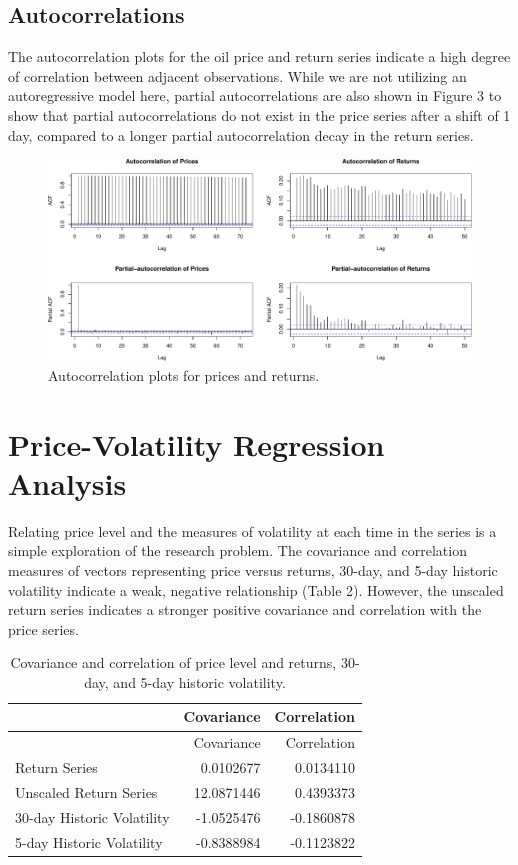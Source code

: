 \documentclass[]{article}
\begin{document}
\subsection{Autocorrelations}\label{autocorrelations}

The autocorrelation plots for the oil price and return series indicate a
high degree of correlation between adjacent observations. While we are
not utilizing an autoregressive model here, partial autocorrelations are
also shown in Figure 3 to show that partial autocorrelations do not
exist in the price series after a shift of 1 day, compared to a longer
partial autocorrelation decay in the return series.

\begin{figure}[htbp]
\centering
\includegraphics{Figs/unnamed-chunk-6-1.pdf}
\caption{Autocorrelation plots for prices and returns.}
\end{figure}

\section{Price-Volatility Regression
Analysis}\label{price-volatility-regression-analysis}

Relating price level and the measures of volatility at each time in the
series is a simple exploration of the research problem. The covariance
and correlation measures of vectors representing price versus returns,
30-day, and 5-day historic volatility indicate a weak, negative
relationship (Table 2). However, the unscaled return series indicates a
stronger positive covariance and correlation with the price series.

\begin{longtable}[]{@{}lrr@{}}
\caption{Covariance and correlation of price level and returns, 30-day,
and 5-day historic volatility.}\tabularnewline
\toprule
& Covariance & Correlation\tabularnewline
\midrule
\endfirsthead
\toprule
& Covariance & Correlation\tabularnewline
\midrule
\endhead
Return Series & 0.0102677 & 0.0134110\tabularnewline
Unscaled Return Series & 12.0871446 & 0.4393373\tabularnewline
30-day Historic Volatility & -1.0525476 & -0.1860878\tabularnewline
5-day Historic Volatility & -0.8388984 & -0.1123822\tabularnewline
\bottomrule
\end{longtable}
\end{document}
